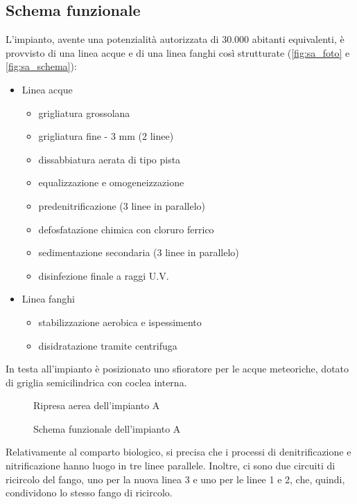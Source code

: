 \subsection{Schema funzionale}
L'impianto, avente una potenzialità autorizzata di 30.000 abitanti equivalenti, è provvisto di una linea acque e di una linea fanghi così strutturate (\autoref{fig:sa_foto} e \autoref{fig:sa_schema}):
\begin{itemize}
	\item Linea acque
		\begin{itemize}
			\item grigliatura grossolana
			\item grigliatura fine - 3 mm (2 linee)
			\item dissabbiatura aerata di tipo pista
			\item equalizzazione e omogeneizzazione
			\item predenitrificazione (3 linee in parallelo)
			\item defosfatazione chimica con cloruro ferrico
			\item sedimentazione secondaria (3 linee in parallelo)
			\item disinfezione finale a raggi U.V.
		\end{itemize}
	\item Linea fanghi
		\begin{itemize}
			\item stabilizzazione aerobica e ispessimento
			\item disidratazione tramite centrifuga
		\end{itemize}
\end{itemize}

In testa all'impianto è posizionato uno sfioratore per le acque meteoriche, dotato di griglia semicilindrica con coclea interna.

\begin{figure}[h]
		\centering
	\caption{Ripresa aerea dell'impianto A}
	\label{fig:sa_foto}
\end{figure}

\begin{figure}[h]
		\centering
	\caption{Schema funzionale dell'impianto A}
	\label{fig:sa_schema}
\end{figure}

Relativamente al comparto biologico, si precisa che i processi di denitrificazione e nitrificazione hanno luogo in tre linee parallele. Inoltre, ci sono due circuiti di ricircolo del fango, uno per la nuova linea 3 e uno per le linee 1 e 2, che, quindi, condividono lo stesso fango di ricircolo.

